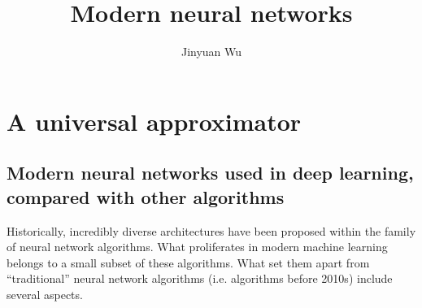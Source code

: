\documentclass[hyperref, a4paper, 12pt]{report}
\title{Modern neural networks}
\author{Jinyuan Wu}
\begin{document}
\maketitle

\chapter{A universal approximator}

\section{Modern neural networks used in deep learning, compared with other algorithms}
\label{sec:modern-network}

Historically, incredibly diverse architectures have been proposed within the family of neural network algorithms.
What proliferates in modern machine learning belongs to a small subset of these algorithms.
What set them apart from ``traditional'' neural network algorithms
(i.e. algorithms before 2010s) include several aspects.
\end{document}
